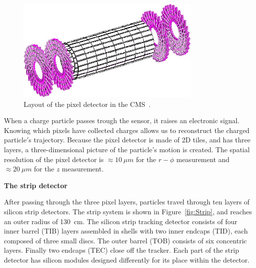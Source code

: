 \begin{figure}[!htbp]
\centering
\includegraphics[width=0.8\textwidth]{figures/pixel.png}
\caption{Layout of the pixel detector in the CMS~\cite{expBook}.}
\label{fig:pixel}
\end{figure}

When a charge particle passes trough the sensor, 
it raises an electronic signal. 
Knowing which pixels have collected charges allows us to reconstruct the charged particle$'$s trajectory. 
Because the pixel detector is made of 2D tiles,  and has three layers,  a three-dimensional picture of the particle's motion is created.
The spatial resolution of the pixel detector is ${\approx}10~ \mu m$ for the $r{-}\phi$ measurement and
${\approx}20~\mu m$ for the $z$ measurement. 





{\bf The strip detector}

After passing through the three pixel layers, particles travel through ten layers of silicon strip detectors. The strip system is shown in Figure~\ref{fig:Strip}, and reaches an outer radius of 130~cm. The silicon strip tracking detector consists of four inner barrel (TIB) layers assembled in shells with two inner endcaps (TID), each composed of three small discs. The outer barrel (TOB) consists of six concentric layers. Finally two endcaps (TEC) close off the tracker. Each part of the strip detector has silicon modules designed differently for its place within the detector.

